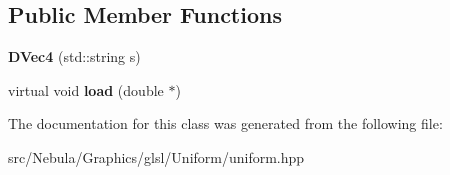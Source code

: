 \subsection*{\-Public \-Member \-Functions}
\begin{DoxyCompactItemize}
\item 
\hypertarget{classNeb_1_1glsl_1_1Uniform_1_1Scalar_1_1DVec4_ab8470910b7562c6a60cb01270b1fa028}{{\bfseries \-D\-Vec4} (std\-::string s)}\label{classNeb_1_1glsl_1_1Uniform_1_1Scalar_1_1DVec4_ab8470910b7562c6a60cb01270b1fa028}

\item 
\hypertarget{classNeb_1_1glsl_1_1Uniform_1_1Scalar_1_1DVec4_af843bf42042cbe62f8744a1621ef4178}{virtual void {\bfseries load} (double $\ast$)}\label{classNeb_1_1glsl_1_1Uniform_1_1Scalar_1_1DVec4_af843bf42042cbe62f8744a1621ef4178}

\end{DoxyCompactItemize}


\-The documentation for this class was generated from the following file\-:\begin{DoxyCompactItemize}
\item 
src/\-Nebula/\-Graphics/glsl/\-Uniform/uniform.\-hpp\end{DoxyCompactItemize}

